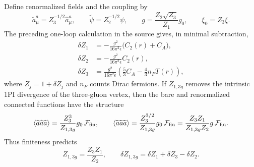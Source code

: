 \begin{enumerate}
  Define renormalized fields and the coupling by
  \[
    \widetilde a_\mu^a=Z_3^{-1/2}\widehat a_\mu^a,\qquad
    \widetilde\psi=Z_2^{-1/2}\psi,\qquad
    g=\frac{Z_2\sqrt{Z_3}}{Z_1}g_0,\qquad \xi_0=Z_3\xi.
  \]
  The preceding one-loop calculation in the source gives, in minimal
  subtraction,
  \[
  \begin{split}
    \delta Z_1&=-\frac{g^2}{16\pi^2\epsilon}
       \bigl(C_2(r)+C_A\bigr),\\
    \delta Z_2&=-\frac{g^2}{16\pi^2\epsilon}C_2(r),\\
    \delta Z_3&=\frac{g^2}{16\pi^2\epsilon}
       \left(\frac53C_A-\frac43n_FT(r)\right),
  \end{split}
  \]
  where \(Z_j=1+\delta Z_j\) and \(n_F\) counts Dirac fermions.  If
  \(Z_{1,3g}\) removes the intrinsic 1PI divergence of the three-gluon
  vertex, then the bare and renormalized connected functions have the
  structure
  \[
    \langle\widehat a\widehat a\widehat a\rangle
      =\frac{Z_3^3}{Z_{1,3g}}g_0\,{\cal F}_{\rm fin},
    \qquad
    \langle\widetilde a\widetilde a\widetilde a\rangle
      =\frac{Z_3^{3/2}}{Z_{1,3g}}g_0\,{\cal F}_{\rm fin}
      =\frac{Z_3Z_1}{Z_{1,3g}Z_2}g\,{\cal F}_{\rm fin}.
  \]
  Thus finiteness predicts
  \[
    Z_{1,3g}=\frac{Z_3Z_1}{Z_2},\qquad
    \delta Z_{1,3g}=\delta Z_1+\delta Z_3-\delta Z_2.
  \]


\end{enumerate}
